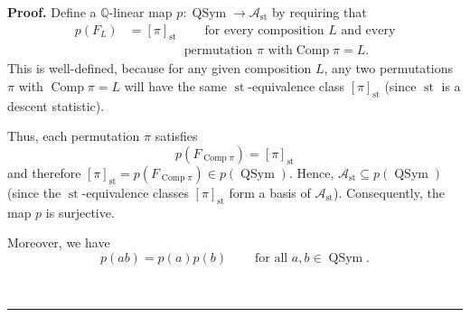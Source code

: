 \documentclass[numbers=enddot,12pt,final,onecolumn,notitlepage]{scrartcl}%
\theoremstyle{definition}
\newenvironment{proof}[1][Proof]{\noindent\textbf{#1.} }{\ \rule{0.5em}{0.5em}}
\newenvironment{verlong}{}{}
\begin{document}
\begin{verlong}
\begin{proof}
Define a $\mathbb{Q}$-linear map $p:\operatorname*{QSym}\rightarrow
\mathcal{A}_{\operatorname*{st}}$ by requiring that%
\begin{align*}
p\left(  F_{L}\right)   &  =\left[  \pi\right]  _{\operatorname*{st}%
}\ \ \ \ \ \ \ \ \ \ \text{for every composition }L\text{ and every}\\
&  \ \ \ \ \ \ \ \ \ \ \ \ \ \ \ \ \ \ \ \ \text{permutation }\pi\text{ with
}\operatorname*{Comp}\pi=L.
\end{align*}
This is well-defined, because for any given composition $L$, any two
permutations $\pi$ with $\operatorname*{Comp}\pi=L$ will have the same
$\operatorname*{st}$-equivalence class $\left[  \pi\right]
_{\operatorname*{st}}$ (since $\operatorname*{st}$ is a descent statistic).

Thus, each permutation $\pi$ satisfies
\begin{equation}
p\left(  F_{\operatorname*{Comp}\pi}\right)  =\left[  \pi\right]
_{\operatorname*{st}} \label{pf.prop.Ast.alg.pFCp}%
\end{equation}
and therefore $\left[  \pi\right]  _{\operatorname*{st}}=p\left(
F_{\operatorname*{Comp}\pi}\right)  \in p\left(  \operatorname*{QSym}\right)
$. Hence, $\mathcal{A}_{\operatorname*{st}}\subseteq p\left(
\operatorname*{QSym}\right)  $ (since the $\operatorname*{st}$-equivalence
classes $\left[  \pi\right]  _{\operatorname*{st}}$ form a basis of
$\mathcal{A}_{\operatorname*{st}}$). Consequently, the map $p$ is surjective.

Moreover, we have%
\begin{equation}
p\left(  ab\right)  =p\left(  a\right)  p\left(  b\right)
\ \ \ \ \ \ \ \ \ \ \text{for all }a,b\in\operatorname*{QSym}.
\label{pf.prop.Ast.alg.pab}%
\end{equation}



\end{proof}
\end{verlong}
\end{document}
